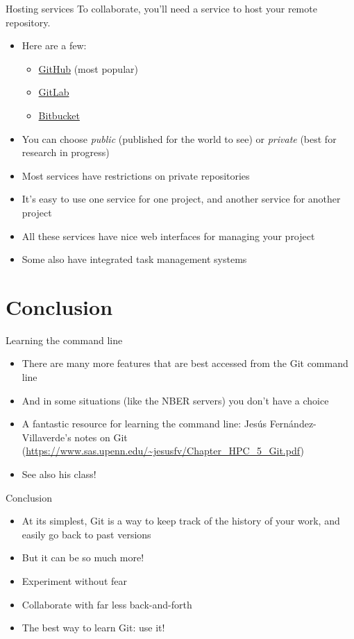 \documentclass{beamer}
\begin{document}
\begin{frame}{Hosting services}
To collaborate, you'll need a service to host your remote repository.
\begin{itemize}
\item Here are a few:
\begin{itemize}
\item \href{https://github.com/}{GitHub} (most popular)
\item \href{https://gitlab.com/}{GitLab}
\item \href{https://bitbucket.org/}{Bitbucket}
\end{itemize}
\item You can choose \textit{public} (published for the world to see) or \textit{private} (best for research in progress)
\item Most services have restrictions on private repositories
\item It's easy to use one service for one project, and another service for another project
\item All these services have nice web interfaces for managing your project
\item Some also have integrated task management systems
\end{itemize}
\end{frame}

\section*{Conclusion}

\begin{frame}{Learning the command line}
\begin{itemize}
\item There are many more features that are best accessed from the Git command line
\item And in some situations (like the NBER servers) you don't have a choice
\item A fantastic resource for learning the command line: Jes\'us Fern\'andez-Villaverde's notes on Git (\url{https://www.sas.upenn.edu/~jesusfv/Chapter_HPC_5_Git.pdf})
\item See also his class!
\end{itemize}
\end{frame}

\begin{frame}{Conclusion}
\begin{itemize}
\item At its simplest, Git is a way to keep track of the history of your work, and easily go back to past versions
\item But it can be so much more!
\item Experiment without fear
\item Collaborate with far less back-and-forth
\item The best way to learn Git: use it!
\end{itemize}
\end{frame}
\end{document}
